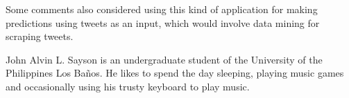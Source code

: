 \documentclass[journal]{./IEEE/IEEEtran}
\begin{document}

Some comments also considered using this kind of application for making predictions using tweets as an input, which would involve data mining for scraping tweets.



\nocite{*}

\begin{biography}
{John Alvin L. Sayson} is an undergraduate student of the University of the Philippines Los Ba\~{n}os. He likes to spend the day sleeping, playing music games and occasionally using his trusty keyboard to play music.
\end{biography}
\end{document}
